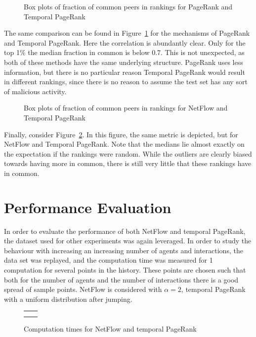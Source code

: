 \documentclass[a4paper,11pt]{book}
\theoremstyle{definition}
\begin{document}
\begin{figure}[ht]
    \centering
    
    \caption{Box plots of fraction of common peers in rankings for PageRank and Temporal PageRank}
    \label{fig:box_pr_tpr}
\end{figure}

The same comparison can be found in Figure~\ref{fig:box_pr_tpr} for the mechanisms of PageRank
and Temporal PageRank. Here the correlation is abundantly clear. Only for the top 1\% the
median fraction in common is below 0.7. This is not unexpected, as both of these methods
have the same underlying structure. PageRank uses less information, but there is no particular
reason Temporal PageRank would result in different rankings, since there is no reason to
assume the test set has any sort of malicious activity.

\begin{figure}[ht]
    \centering
    
    \caption{Box plots of fraction of common peers in rankings for NetFlow and Temporal PageRank}
    \label{fig:box_netflow_tpr}
\end{figure}

Finally, consider Figure~\ref{fig:box_netflow_tpr}. In this figure, the same metric is depicted, but
for NetFlow and Temporal PageRank. Note that the medians lie almost exactly on the expectation
if the rankings were random. While the outliers are clearly biased towards having more in common,
there is still very little that these rankings have in common.

\section{Performance Evaluation}

In order to evaluate the performance of both NetFlow and temporal PageRank, the dataset used for
other experiments was again leveraged. In order to study the behaviour with increasing an increasing
number of agents and interactions, the data set was replayed, and the computation time was measured
for 1 computation for several points in the history. These points are chosen such that
both for the number of agents and the number of interactions there is a good spread of
sample points.
NetFlow is considered with $\alpha=2$, temporal PageRank with a uniform
distribution after jumping. 

\begin{figure}[ht]
    \centering
    \begin{tabular}[ht]{cc}
         &
         \\
         &
         \\

    \end{tabular}
    \caption{Computation times for NetFlow and temporal PageRank}
    \label{fig:performance}
\end{figure}
\end{document}
